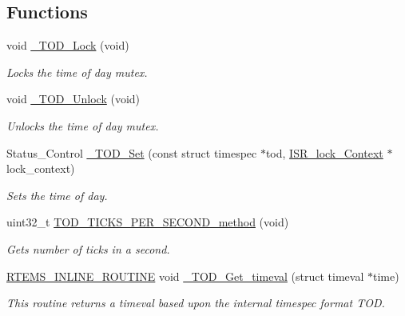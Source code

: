 \subsection*{Functions}
\begin{DoxyCompactItemize}
\item 
\mbox{\label{group__RTEMSScoreTOD_gaa2df91a104bbb9f17074543979bf0e1c}} 
void \mbox{\hyperlink{group__RTEMSScoreTOD_gaa2df91a104bbb9f17074543979bf0e1c}{\+\_\+\+T\+O\+D\+\_\+\+Lock}} (void)
\begin{DoxyCompactList}\small\item\em Locks the time of day mutex. \end{DoxyCompactList}\item 
\mbox{\label{group__RTEMSScoreTOD_ga5fc2b439addee0c1c8372dc4db417c1f}} 
void \mbox{\hyperlink{group__RTEMSScoreTOD_ga5fc2b439addee0c1c8372dc4db417c1f}{\+\_\+\+T\+O\+D\+\_\+\+Unlock}} (void)
\begin{DoxyCompactList}\small\item\em Unlocks the time of day mutex. \end{DoxyCompactList}\item 
Status\+\_\+\+Control \mbox{\hyperlink{group__RTEMSScoreTOD_ga1c22915a212fe0e27a891dfc57d4bfcb}{\+\_\+\+T\+O\+D\+\_\+\+Set}} (const struct timespec $\ast$tod, \mbox{\hyperlink{structISR__lock__Context}{I\+S\+R\+\_\+lock\+\_\+\+Context}} $\ast$lock\+\_\+context)
\begin{DoxyCompactList}\small\item\em Sets the time of day. \end{DoxyCompactList}\item 
uint32\+\_\+t \mbox{\hyperlink{group__RTEMSScoreTOD_ga8bcb0f19ff76e742900cc90ebe6a49bd}{T\+O\+D\+\_\+\+T\+I\+C\+K\+S\+\_\+\+P\+E\+R\+\_\+\+S\+E\+C\+O\+N\+D\+\_\+method}} (void)
\begin{DoxyCompactList}\small\item\em Gets number of ticks in a second. \end{DoxyCompactList}\item 
\mbox{\hyperlink{group__RTEMSScoreBaseDefs_gac216239df231d5dbd15e3520b0b9313f}{R\+T\+E\+M\+S\+\_\+\+I\+N\+L\+I\+N\+E\+\_\+\+R\+O\+U\+T\+I\+NE}} void \mbox{\hyperlink{group__RTEMSScoreTOD_ga607a5281a16201ae5175c1146d7aab91}{\+\_\+\+T\+O\+D\+\_\+\+Get\+\_\+timeval}} (struct timeval $\ast$time)
\begin{DoxyCompactList}\small\item\em This routine returns a timeval based upon the internal timespec format T\+OD. \end{DoxyCompactList}\item 

\end{DoxyCompactItemize}
